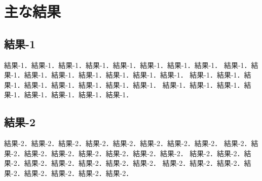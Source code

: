 ﻿%
\chapter{主な結果}

\section{結果-1}

結果-1．結果-1．結果-1．結果-1．結果-1．結果-1．結果-1．結果-1．
結果-1．結果-1．結果-1．結果-1．結果-1．結果-1．結果-1．結果-1．
結果-1．結果-1．結果-1．結果-1．結果-1．結果-1．結果-1．結果-1．
結果-1．結果-1．結果-1．結果-1．結果-1．結果-1．結果-1．結果-1．


\section{結果-2}

結果-2．結果-2．結果-2．結果-2．結果-2．結果-2．結果-2．結果-2．
結果-2．結果-2．結果-2．結果-2．結果-2．結果-2．結果-2．結果-2．
結果-2．結果-2．結果-2．結果-2．結果-2．結果-2．結果-2．結果-2．
結果-2．結果-2．結果-2．結果-2．結果-2．結果-2．結果-2．結果-2．

